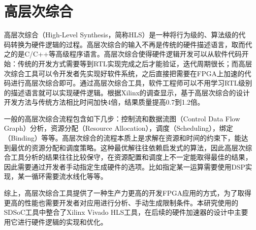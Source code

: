 \section{高层次综合}

高层次综合（High-Level Synthesis，简称HLS）是一种将行为级的、算法级的代码转换为硬件逻辑的过程。高层次综合的输入不再是传统的硬件描述语言，取而代之的是C/C++等高级程序语言。高层次综合使得硬件逻辑开发可以从软件代码开始：传统的开发方式需要等到RTL实现完成之后才能验证，迭代周期很长；而高层次综合工具可以令开发者先实现好软件系统，之后直接把需要在FPGA上加速的代码进行高层次综合即可。通过高层次综合工具，软件工程师可以不用学习RTL级别的描述语言就可以实现硬件逻辑。根据Xilinx的调查显示，基于高层次综合的设计开发方法与传统方法相比时间加快4倍，结果质量提高0.7到1.2倍。

一般的高层次综合流程包含如下几步：控制流和数据流图（Control Data Flow Graph）分析，资源分配（Resource Allocation），调度（Scheduling），绑定（Binding）等等。高层次综合的流程本质上是求解在资源和时间的约束下，能达到最优的资源分配和调度策略。这种最优解往往依赖启发式的算法，因此高层次综合工具分析的结果往往比较保守，在资源配置和调度上不一定能取得最佳的结果，因此需要通过开发者手动指定生成硬件的选项。比如指定某一运算需要使用DSP实现，某一循环需要流水线化等等。

综上，高层次综合工具提供了一种生产力更高的开发FPGA应用的方式，为了取得更高的性能也需要开发者对应用进行分析、手动生成限制条件。本研究使用的SDSoC工具中整合了Xilinx Vivado HLS工具，在后续的硬件加速器的设计中主要用它进行硬件逻辑的实现和优化。
